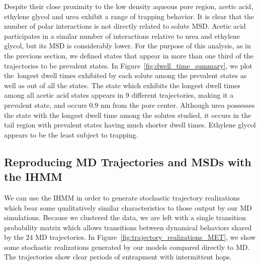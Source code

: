 \documentclass[journal=jpcbfk,manuscript=article]{achemso}
\begin{document}
  Despite their close proximity to the low density aqueous pore region, acetic
  acid, ethylene glycol and urea exhibit a range of trapping behavior.
  It is clear that the number of polar interactions is not directly
  related to solute MSD. Acetic acid participates in a similar number of 
  interactions relative to urea and ethylene glycol, but its MSD is considerably
  lower. For the purpose of this analysis, as in the previous section, we 
  defined states that appear in more than one third of the trajectories to
  be prevalent states. In Figure~\ref{fig:dwell_time_summary}, we plot the\
  longest dwell times exhibited by each solute among the prevalent states as 
  well as out of all the states. The state which exhibits the longest dwell
  times among all acetic acid states appears in 9 different trajectories, 
  making it a prevalent state, and occurs 0.9 nm from the pore center.
  Although urea possesses the state with the longest dwell time among the
  solutes studied, it occurs in the tail region with prevalent states having 
  much shorter dwell times. Ethylene glycol appears to be the least subject to
  trapping.


  \subsection{Reproducing MD Trajectories and MSDs with the IHMM}
  
  
  We can use the IHMM in order to generate stochastic trajectory realizations
  which bear some qualitatively similar characteristics to those output
  by our MD simulations. Because we clustered the data, we are left with a 
  single transition probability matrix which allows transitions between dynamical
  behaviors shared by the 24 MD trajectories. In 
  Figure~\ref{fig:trajectory_realizations_MET}, we show some stochastic realizations
  generated by our models compared directly to MD. The trajectories show clear 
  periods of entrapment with intermittent hops.
  
\end{document}

